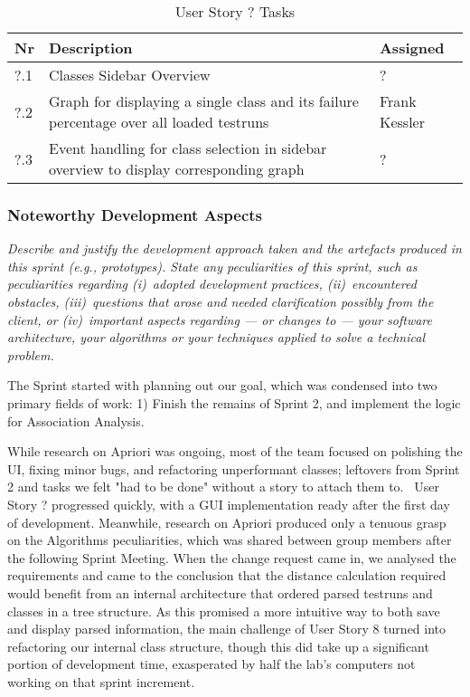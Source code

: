 \begin{table}[h]
  \caption{User Story ? Tasks}
  \label{Story ? Tasks}
  \centering
  \begin{tabular}{p{1cm}|p{5cm}|p{3cm}|}
  	Nr & Description & Assigned \\ 
  	\hline
  	?.1 & Classes Sidebar Overview & ? \\ 
  	\hline
  	?.2 & Graph for displaying a single class and its failure percentage over all loaded testruns & Frank Kessler \\ 
  	\hline
  	?.3 & Event handling for class selection in sidebar overview to display corresponding graph & ? \\ 
  	\hline
  \end{tabular}
\end{table}


\subsubsection*{Noteworthy Development Aspects}
\emph{Describe and justify the development approach taken and the artefacts produced in this sprint (e.g., prototypes).  State any peculiarities of this sprint, such as peculiarities  regarding (i)~adopted development practices, (ii)~encountered obstacles, (iii)~questions that arose and needed clarification possibly from the client, or (iv)~important aspects regarding --- or changes to --- your software architecture, your algorithms or your techniques applied to solve a technical problem.}

The Sprint started with planning out our goal, which was condensed into two primary fields of work: 1) Finish the remains of Sprint 2, and implement the logic for Association Analysis. 

While research on Apriori was ongoing, most of the team focused on polishing the UI, fixing minor bugs, and refactoring unperformant classes; leftovers from Sprint 2 and tasks we felt "had to be done" without a story to attach them to. \
User Story ? progressed quickly, with a GUI implementation ready after the first day of development. 
Meanwhile, research on Apriori produced only a tenuous grasp on the Algorithms peculiarities, which was shared between group members after the following Sprint Meeting. 
When the change request came in, we analysed the requirements and came to the conclusion that the distance calculation required  would benefit from an internal architecture that ordered parsed testruns and classes in a tree structure. 
As this promised a more intuitive way to both save and display parsed information, the main challenge of User Story 8 turned into refactoring our internal class structure, though this did take up a significant portion of development time, exasperated by half the lab's computers not working on that sprint increment.  


